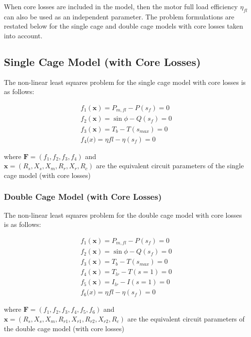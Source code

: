 \documentclass{article}
\begin{document}
When core losses are included in the model, then the motor full load efficiency $\eta_{fl}$ can also be used as an independent parameter. The problem formulations are restated below for the single cage and double cage models with core losses taken into account. 

\subsection{Single Cage Model (with Core Losses)}

The non-linear least squares problem for the single cage model with core losses is as follows:

\begin{eqnarray}
f_{1} (\mathbf x) = P_{m,fl} - P(s_{f}) = 0 \\
f_{2} (\mathbf x) = \sin{\phi} - Q(s_{f})  = 0 \\
f_{3} (\mathbf x) = T_{b} - T(s_{max}) = 0 \\
f_{4} \mathbf (x) = \eta{fl} - \eta(s_{f}) = 0
\end{eqnarray}

\noindent where $\mathbf{F} = ( f_1, f_2, f_3, f_4 )$ and \\ 
\indent $\mathbf{x} = ( R_s, X_s, X_m, R_{r}, X_{r}, R_{c} )$ are the equivalent circuit parameters of the single cage model (with core losses)

\subsubsection{Double Cage Model (with Core Losses)}

The non-linear least squares problem for the double cage model with core losses is as follows:

\begin{eqnarray}
f_{1} (\mathbf x) = P_{m,fl} - P(s_{f}) = 0 \\
f_{2} (\mathbf x) = \sin{\phi} - Q(s_{f})  = 0 \\
f_{3} (\mathbf x) = T_{b} - T(s_{max}) = 0 \\
f_{4} (\mathbf x) = T_{lr} - T(s=1) = 0 \\
f_{5} (\mathbf x) = I_{lr} - I(s=1) = 0 \\
f_{6} \mathbf (x) = \eta{fl} - \eta(s_{f}) = 0
\end{eqnarray}

\noindent where $\mathbf{F} = ( f_1, f_2, f_3, f_4, f_5, f_6 )$ and \\ 
\indent $\mathbf{x} = ( R_s, X_s, X_m, R_{r1}, X_{r1}, R_{r2}, X_{r2}, R_{c} )$ are the equivalent circuit parameters of the double cage model (with core losses)
\end{document}
